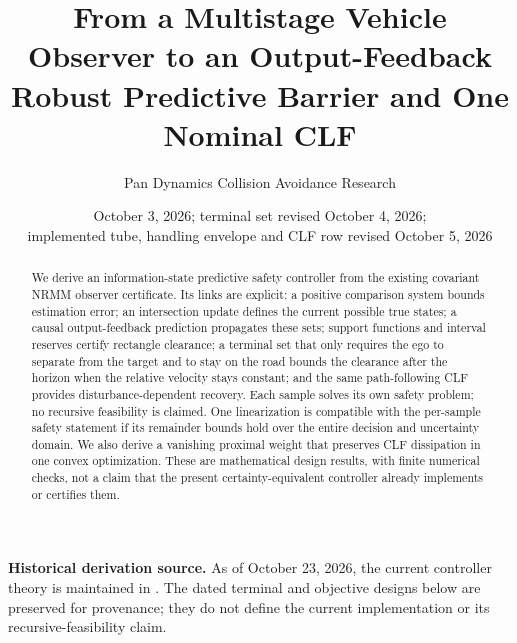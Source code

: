 \documentclass[10pt,letterpaper]{article}
\title{From a Multistage Vehicle Observer to an Output-Feedback\protect\\
Robust Predictive Barrier and One Nominal CLF}
\author{Pan Dynamics Collision Avoidance Research}
\date{October 3, 2026; terminal set revised October 4, 2026;\protect\\
implemented tube, handling envelope and CLF row revised October 5, 2026}
\begin{document}
\maketitle
\noindent\textbf{Historical derivation source.} As of October 23, 2026, the current
controller theory is maintained in .
The dated terminal and objective designs below are preserved for provenance;
they do not define the current implementation or its recursive-feasibility claim.
\par\medskip
\begin{abstract}
We derive an information-state predictive safety controller from the existing
covariant NRMM observer certificate. Its links are explicit: a positive
comparison system bounds estimation error; an intersection update defines the
current possible true states; a causal output-feedback prediction propagates
these sets; support functions and interval reserves certify rectangle clearance;
a terminal set that only requires the ego to separate from the target and to
stay on the road bounds the clearance after the horizon when the relative
velocity stays constant; and the same path-following CLF provides
disturbance-dependent recovery. Each sample solves its own safety problem; no
recursive feasibility is claimed. One linearization is compatible with the
per-sample safety statement if its remainder bounds hold over the entire
decision and uncertainty domain. We also derive a vanishing proximal weight that
preserves CLF dissipation in one convex optimization. These are mathematical
design results, with finite numerical checks, not a claim that the present
certainty-equivalent controller already implements or certifies them.
\end{abstract}
\end{document}
